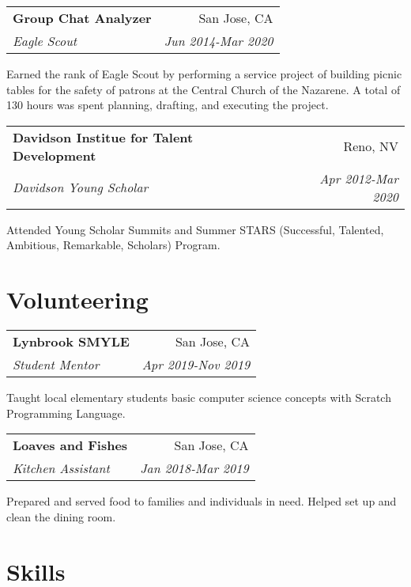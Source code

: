 \documentclass[letterpaper,11pt]{article}
\makeatletter
\newcommand{\resumeSubheading}[4]{
  \vspace{0.25em}
  \begin{tabular*}{0.97\textwidth}[t]{l@{\extracolsep{\fill}}r}
    \textbf{#1} & #2 \\
    \textit{\small#3} & \textit{\small #4} \\
  \end{tabular*}\vspace{0.25em}
}
\makeatother
\begin{document}
\resumeSubheading{Group Chat Analyzer}
{San Jose, CA}{Eagle Scout}{Jun 2014-Mar 2020}

Earned the rank of Eagle Scout by performing a service project of building picnic tables for the safety of patrons at the Central Church of the Nazarene. A total of 130 hours was spent planning, drafting, and executing the project. 

\resumeSubheading{Davidson Institue for Talent Development}
{Reno, NV}{Davidson Young Scholar}{Apr 2012-Mar 2020}

Attended Young Scholar Summits and Summer STARS (Successful, Talented, Ambitious, Remarkable, Scholars) Program.

\section{Volunteering}

\resumeSubheading{Lynbrook SMYLE}
{San Jose, CA}{Student Mentor}{Apr 2019-Nov 2019}

Taught local elementary students basic computer science concepts with Scratch Programming Language. 

\resumeSubheading{Loaves and Fishes}
{San Jose, CA}{Kitchen Assistant}{Jan 2018-Mar 2019}

Prepared and served food to families and individuals in need. Helped set up and clean the dining room.

\section{Skills}
\end{document}
